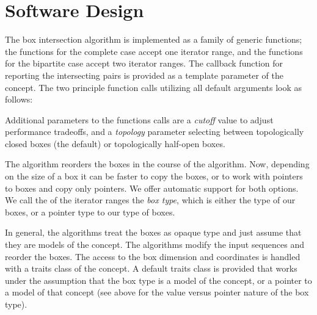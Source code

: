 \section{Software Design}

The box intersection algorithm is implemented as a family of generic
functions; the functions for the complete case accept one iterator
range, and the functions for the bipartite case accept two iterator
ranges. The callback function for reporting the intersecting pairs is
provided as a template parameter of the  concept.
The two principle function calls utilizing all default arguments look
as follows:





Additional parameters to the functions calls are a \emph{cutoff\/}
value to adjust performance tradeoffs, and a \emph{topology} parameter
selecting between topologically closed boxes (the default) or
topologically half-open boxes.

The algorithm reorders the boxes in the course of the algorithm. Now,
depending on the size of a box it can be faster to copy the boxes, or
to work with pointers to boxes and copy only pointers. We offer
automatic support for both options. We call the  of
the iterator ranges the \emph{box type}, which is either the type of
our boxes, or a pointer type to our type of boxes.


In general, the algorithms treat the boxes as opaque type and just
assume that they are models of the  concept. The
algorithms modify the input sequences and reorder the boxes. The
access to the box dimension and coordinates is handled with a traits
class of the  concept. A default traits
class is provided that works under the assumption that the box type is
a model of the  concept, or a pointer to a
model of that concept (see above for the value versus pointer nature
of the box type).

